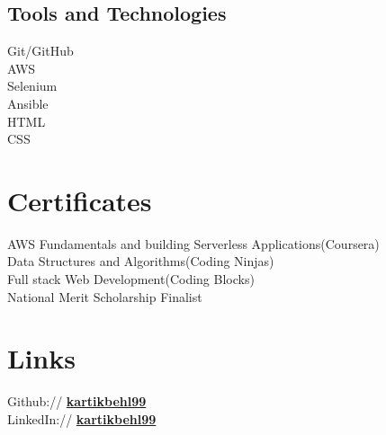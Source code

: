 \documentclass[]{deedy-resume-reversed}
\begin{document}
\begin{minipage}[t]{0.33\textwidth}
\subsection{Tools and Technologies}
\textbullet{} Git/GitHub \\
\textbullet{} AWS \\
\textbullet{} Selenium \\
\textbullet{} Ansible \\
\textbullet{} HTML \\
\textbullet{} CSS \\
\sectionsep





\section{Certificates}
AWS Fundamentals and building Serverless Applications(Coursera)\\
Data Structures and Algorithms(Coding Ninjas)\\
Full stack Web Development(Coding Blocks)\\
National Merit Scholarship Finalist \\
\sectionsep


\section{Links}
Github:// \href{https://github.com/kartikbehl99}{\bf kartikbehl99} \\
LinkedIn://  \href{https://www.linkedin.com/in/kartik-behl-b46a3484/}{\bf kartikbehl99} \\
\sectionsep

\end{minipage}
\end{document}
